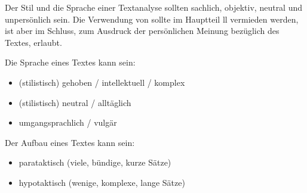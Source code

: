 
Der Stil und die Sprache einer Textanalyse sollten sachlich, objektiv, neutral und unpers\"{o}nlich sein. Die Verwendung von  sollte im Hauptteil ll vermieden werden, ist aber im Schluss, zum Ausdruck der pers\"{o}nlichen Meinung bez\"{u}glich des Textes, erlaubt. 


Die Sprache eines Textes kann sein:

\begin{itemize}
	\item (stilistisch) gehoben / intellektuell / komplex
	\item (stilistisch) neutral / allt\"{a}glich
	\item umgangsprachlich / vulg\"{a}r
\end{itemize}

Der Aufbau eines Textes kann sein:

\begin{itemize}
	\item parataktisch (viele, b\"{u}ndige, kurze S\"{a}tze)
	\item hypotaktisch (wenige, komplexe, lange S\"{a}tze)
\end{itemize}

